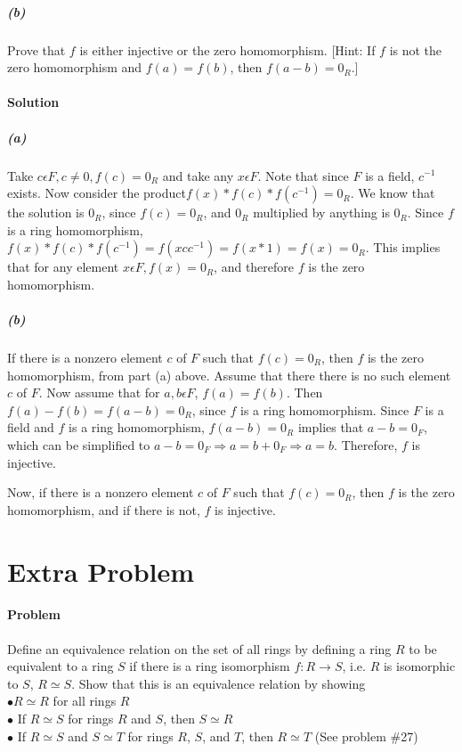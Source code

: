 \documentclass[a4paper,11pt]{article}
\begin{document}
\subparagraph{(b)}
Prove that $f$ is either injective or the zero homomorphism. [Hint: If $f$ is not the zero homomorphism and $f(a)= f(b)$, then $f(a-b) = 0_R$.]

\paragraph{Solution}
\subparagraph{(a)}
Take $c \epsilon F, c \neq 0, f(c) = 0_R$ and take any $x \epsilon F$. Note that since $F$ is a field, $c^{-1}$ exists. Now consider the product$f(x)*f(c)*f(c^{-1}) = 0_R$. We know that the solution is $0_R$, since $f(c) = 0_R$, and $0_R$ multiplied by anything is $0_R$. Since $f$ is a ring homomorphism, $f(x)*f(c)*f(c^{-1}) = f(xcc^{-1}) = f(x*1) = f(x) = 0_R$. This implies that for any element $x \epsilon F, f(x) = 0_R$, and therefore $f$ is the zero homomorphism.

\subparagraph{(b)}
If there is a nonzero element $c$ of $F$ such that $f(c) = 0_R$, then $f$ is the zero homomorphism, from part (a) above. Assume that there there is no such element $c$ of $F$. Now assume that for $a,b \epsilon F$, $f(a) = f(b)$. Then $f(a) - f(b) = f(a-b) = 0_R$, since $f$ is a ring homomorphism. Since $F$ is a field and $f$ is a ring homomorphism, $f(a-b) = 0_R$ implies that $a-b = 0_F$, which can be simplified to $a-b = 0_F \Rightarrow a = b + 0_F \Rightarrow a = b$. Therefore, $f$ is injective.

Now, if there is a nonzero element $c$ of $F$ such that $f(c) = 0_R$, then $f$ is the zero homomorphism, and if there is not, $f$ is injective.

\section{Extra Problem}
\paragraph{Problem}
Define an equivalence relation on the set of all rings by defining a ring $R$ to be equivalent to a ring $S$ if there is a ring isomorphism $f: R \rightarrow S$, i.e. $R$ is isomorphic to $S$, $R \simeq S$. 
Show that this is an equivalence relation by showing\\
$\bullet R \simeq R$ for all rings $R$\\
$\bullet$ If $R \simeq S$ for rings $R$ and $S$, then $S \simeq R$\\
$\bullet$ If $R \simeq S$ and $S \simeq T$ for rings $R$, $S$, and $T$, then $R \simeq T$ (See problem \#27)
\end{document}
